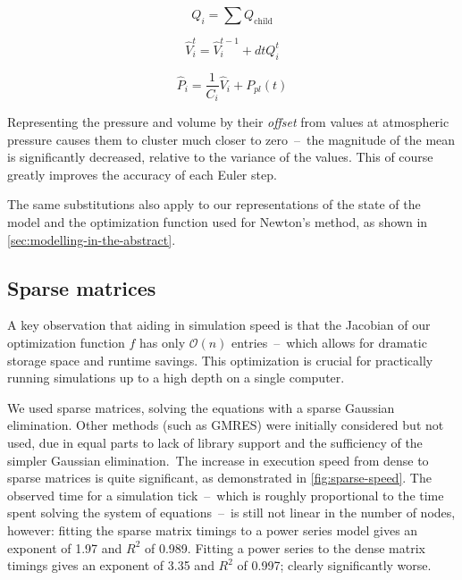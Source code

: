 \begin{equation}
    Q_i = \sum Q_{\text{child}}
\end{equation}

\begin{equation}
    \hat{V}_i^t = \hat{V}_i^{t-1} + dt Q_i^t
\end{equation}

\begin{equation}
    \hat{P}_i = \frac{1}{C_i} \hat{V}_i + P_{pl}(t)
\end{equation}

Representing the pressure and volume by their \textit{offset} from values at atmospheric pressure
causes them to cluster much closer to zero~--~the magnitude of the mean is significantly decreased,
relative to the variance of the values. This of course greatly improves the accuracy of each Euler
step.

The same substitutions also apply to our representations of the state of the model and the
optimization function used for Newton's method, as shown in \autoref{sec:modelling-in-the-abstract}.

\subsection{Sparse matrices} \label{sec:sparse-matrices}

A key observation that aiding in simulation speed is that the Jacobian of our optimization function
$f$ has only $\mathcal{O}(n)$ entries~--~which allows for dramatic storage space and runtime
savings. This optimization is crucial for practically running simulations up to a high depth on a
single computer.

We used sparse matrices, solving the equations with a sparse Gaussian elimination. Other methods
(such as GMRES) were initially considered but not used, due in equal parts to lack of library
support and the sufficiency of the simpler Gaussian elimination.\footnotemark\ The increase in
execution speed from dense to sparse matrices is quite significant, as demonstrated in
\autoref{fig:sparse-speed}. The observed time for a simulation tick~--~which is roughly proportional
to the time spent solving the system of equations~--~is still not linear in the number of nodes,
however: fitting the sparse matrix timings to a power series model gives an exponent of 1.97 and
$R^2$ of 0.989. Fitting a power series to the dense matrix timings gives an exponent of 3.35 and
$R^2$ of 0.997; clearly significantly worse.

